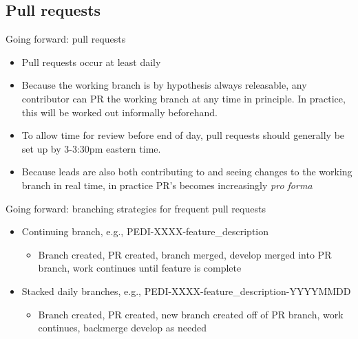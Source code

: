 \documentclass{beamer}
\begin{document}
	\subsection{Pull requests}
	\begin{frame}{Going forward: pull requests}
		\begin{itemize}
			\item Pull requests occur at least daily \pause
			\item Because the working branch is by hypothesis always releasable, any contributor can PR the working branch at any time in principle. In practice, this will be worked out informally beforehand. \pause
			\item To allow time for review before end of day, pull requests should generally be set up by 3-3:30pm eastern time. \pause
			\item Because leads are also both contributing to and seeing changes to the working branch in real time, in practice PR's becomes increasingly \textit{pro forma} \pause
		\end{itemize}
	\end{frame}
	\begin{frame}{Going forward: branching strategies for frequent pull requests}
		\begin{itemize}
			\item Continuing branch, e.g., PEDI-XXXX-feature\_description \pause
			\begin{itemize}
				\item Branch created, PR created, branch merged, develop merged into PR branch, work continues until feature is complete \pause
			\end{itemize}
			\item Stacked daily branches, e.g., PEDI-XXXX-feature\_description-YYYYMMDD \pause
			\begin{itemize}
				\item Branch created, PR created, new branch created off of PR branch, work continues, backmerge develop as needed \pause
			\end{itemize}
		\end{itemize}
	\end{frame}
\end{document}
